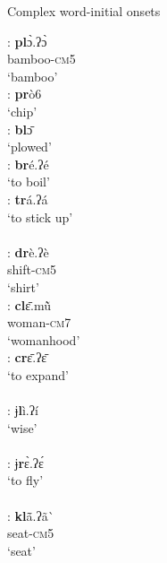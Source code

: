 \documentclass[output=paper]{langscibook}
\begin{document}
\vspace{2cm}
 \begin{exe}
    \ex Complex word-initial onsets \label{ex:traore:complexOnsetWordInitial:12}
    \nopagebreak
    \begin{multicols}{2}
    \begin{xlisti}
        \ex \glll [pl]: \textbf{pl}ɔ̀.ʔɔ̀ \\
            {}      bamboo-\textsc{cm}5\\
            {} ‘bamboo’\\ 
        \ex \gll [pr]: \textbf{pr}ò6\\
            {}  `chip'\\
        \ex \gll [bl]:        \textbf{bl}ɔ̄ \\
            {}      `plowed'\\
        \ex \gll [br]:      \textbf{br}é.ʔé \\
            {} {`to boil'}\\
        \ex \glll [tr]:        \textbf{tr}á.ʔá\\
            {}      {`to stick up'}\\
            {} {}\\
        \ex \glll [dr]:      \textbf{dr}è.ʔè \\
            {}      shift-\textsc{cm}5\\
            {}      `shirt'\\
        \ex \glll [cl]:       \textbf{cl}ɛ̄.mũ̀ \\
            {} woman-\textsc{cm}7\\
            {} `womanhood'\\
        \ex \glll [cr]:        \textbf{cr}ɛ̄.ʔɛ̄  \\
            {}          {`to expand'}\\
            {} {} \\
        \ex \glll [ɉl]:         ɉ\textbf{l}ì.ʔí\\
            {}          `wise'\\
            {} {} \\
        \ex  \glll [ɉr]:        ɉ\textbf{r}ɛ̀.ʔɛ́ \\
            {}          {`to fly'}\\
            {} {} \\
        \ex \glll [kl]:       \textbf{kl}ã\={}.ʔã\`{}~\\
            {} seat-\textsc{cm}5\\
            {} `seat'\\

\end{xlisti}
\end{multicols}
\end{exe}
\end{document}
